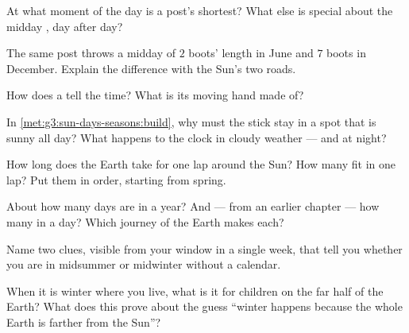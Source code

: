 \begin{exercise}[$\star$]\label{exo:g3:sun-days-seasons:2}
At what moment of the day is a post's  shortest? What else is
special about the midday , day after day?
\end{exercise}

\begin{exercise}[$\star$]\label{exo:g3:sun-days-seasons:3}
The same post throws a midday  of $2$ boots' length in June
and $7$ boots in December. Explain the difference with the Sun's
two roads.
\end{exercise}

\begin{exercise}[$\star$]\label{exo:g3:sun-days-seasons:4}
How does a  tell the time? What is its moving hand made of?
\end{exercise}

\begin{exercise}[$\star$]\label{exo:g3:sun-days-seasons:5}
In \cref{met:g3:sun-days-seasons:build}, why must the stick stay in
a spot that is sunny all day? What happens to the clock in cloudy
weather --- and at night?
\end{exercise}

\begin{exercise}[$\star$]\label{exo:g3:sun-days-seasons:6}
How long does the Earth take for one lap around the Sun? How many
 fit in one lap? Put them in order, starting from spring.
\end{exercise}

\begin{exercise}[$\star$]\label{exo:g3:sun-days-seasons:7}
About how many days are in a year? And --- from an earlier chapter
--- how many  in a day? Which journey of the Earth makes each?
\end{exercise}

\begin{exercise}[$\star$]\label{exo:g3:sun-days-seasons:8}
Name two clues, visible from your window in a single week, that
tell you whether you are in midsummer or midwinter without a
calendar.
\end{exercise}

\begin{exercise}[$\star$]\label{exo:g3:sun-days-seasons:9}
When it is winter where you live, what  is it for children on
the far half of the Earth? What does this prove about the guess
``winter happens because the whole Earth is farther from the Sun''?
\end{exercise}


